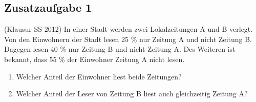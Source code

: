 \subsection*{Zusatzaufgabe 1}

(Klausur SS 2012) In einer Stadt werden zwei Lokalzeitungen A und B verlegt. Von den Einwohnern der Stadt lesen 25 \% nur Zeitung A und nicht Zeitung B. Dagegen lesen 40 \% nur Zeitung B und nicht Zeitung A. Des Weiteren ist bekannt, dass 55 \% der Einwohner Zeitung A nicht lesen.


\begin{enumerate} [label=\alph*)]
\item Welcher Anteil der Einwohner liest beide Zeitungen?
\item Welcher Anteil der Leser von Zeitung B liest auch gleichzeitig Zeitung A?

\end{enumerate}